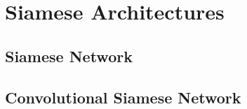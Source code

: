 \section{Siamese Architectures}
\subsection{Siamese Network}
\subsection{Convolutional Siamese Network}
